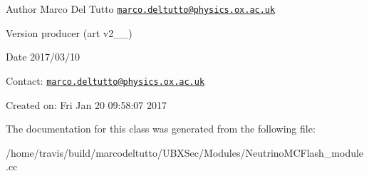 \begin{DoxyAuthor}{Author}
Marco Del Tutto \href{mailto:marco.deltutto@physics.ox.ac.uk}{\tt marco.\-deltutto@physics.\-ox.\-ac.\-uk}
\end{DoxyAuthor}
\begin{DoxyVersion}{Version}
producer (art v2\-\_\-\_)
\end{DoxyVersion}
\begin{DoxyDate}{Date}
2017/03/10
\end{DoxyDate}
Contact\-: \href{mailto:marco.deltutto@physics.ox.ac.uk}{\tt marco.\-deltutto@physics.\-ox.\-ac.\-uk}

Created on\-: Fri Jan 20 09\-:58\-:07 2017 

The documentation for this class was generated from the following file\-:\begin{DoxyCompactItemize}
\item 
/home/travis/build/marcodeltutto/\-U\-B\-X\-Sec/\-Modules/Neutrino\-M\-C\-Flash\-\_\-module.\-cc\end{DoxyCompactItemize}
